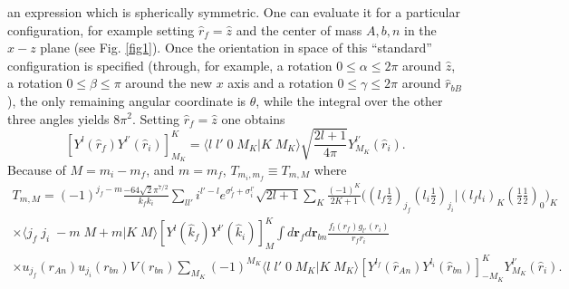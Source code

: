 an expression which is spherically symmetric. One can evaluate it for a particular configuration, for example setting $\hat r_f=\hat z$ and the center of mass $A,b,n$  in the $x-z$ plane (see Fig. \ref{fig1}). Once the orientation in space of this ``standard'' configuration is specified (through, for example, a rotation $0\leq\alpha\leq 2\pi$ around $\hat z$, a rotation $0\leq\beta\leq \pi$ around the new $x$ axis and a rotation $0\leq\gamma\leq 2\pi$ around $\hat r_{bB}$), the only remaining angular coordinate is $\theta$, while the integral over the other three angles yields   $8\pi^2$. Setting $\hat r_f=\hat z$ one obtains
\begin{equation}\label{eq_onept18}
\left[ Y^{l} (\hat r_f) Y^{l'} (\hat r_i)\right]^K_{M_K}=\langle l\;l'\;0\;M_K|K\;M_K\rangle\sqrt{\frac{2l+1}{4\pi}}Y_{M_K}^{l'}(\hat r_i).
\end{equation}
Because of $M=m_i-m_f$, and $m=m_f$,  $T_{m_i,m_f}\equiv T_{m,M} $ where
\begin{multline}\label{eq_onept19}
T_{m,M}=(-1)^{j_f-m}\frac{-64\sqrt{2}\pi^{7/2}}{k_f k_i}\sum_{ll'}i^{l'-l}e^{\sigma_f^l+\sigma_i^{l'}}\sqrt{2l+1}\sum_K\frac{(-1)^{K}}{2K+1}\bigl((l_f \tfrac{1}{2})_{j_f}(l_i \tfrac{1}{2})_{j_i}|(l_f l_i)_K(\tfrac{1}{2} \tfrac{1}{2})_0\bigr)_K\\
\times\langle j_f\;j_i\;-m\;M+m|K\;M\rangle\left[ Y^{l} (\hat k_f) Y^{l'} (\hat k_i)\right]^K_{M}\int d\mathbf{r}_fd\mathbf{r}_{bn}\frac{f_l(r_f)g_{l'}(r_i)}{r_fr_i}\\
\times u_{j_f}(r_{An})u_{j_i}(r_{bn})V(r_{bn})
\sum_{M_K}(-1)^{M_K}\langle l\;l'\;0\;M_K|K\;M_K\rangle \left[ Y^{l_f}(\hat r_{An}) Y^{l_i}(\hat r_{bn})\right]^K_{-M_K}Y_{M_K}^{l'}(\hat r_i).
\end{multline}



